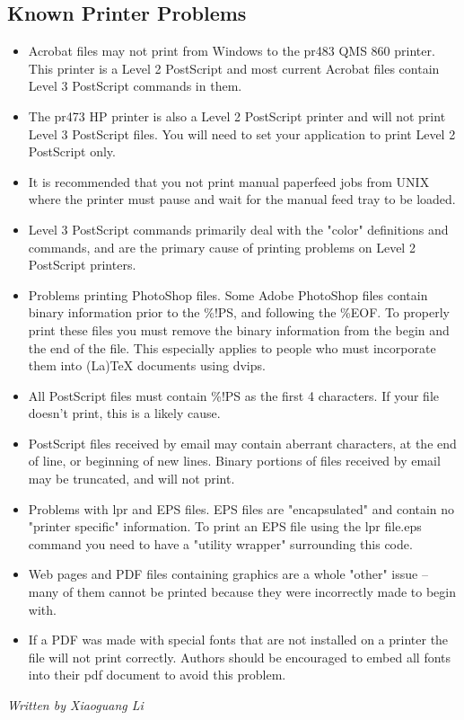 \documentclass[12pt,a4paper]{article}
\begin{document}
\subsection*{Known Printer Problems}
\begin{itemize}
    \item Acrobat files may not print from Windows to the pr483 QMS 860 printer. This printer is a Level 2 PostScript and most current Acrobat files contain Level 3 PostScript commands in them.
    \item The pr473 HP printer is also a Level 2 PostScript printer and will not print Level 3 PostScript files. You will need to set your application to print Level 2 PostScript only.
    \item It is recommended that you not print manual paperfeed jobs from UNIX where the printer must pause and wait for the manual feed tray to be loaded.
    \item Level 3 PostScript commands primarily deal with the "color" definitions and commands, and are the primary cause of printing problems on Level 2 PostScript printers.
    \item Problems printing PhotoShop files. Some Adobe PhotoShop files contain binary information prior to the \%!PS, and following the \%EOF. To properly print these files you must remove the binary information from the begin and the end of the file. This especially applies to people who must incorporate them into (La)TeX documents using dvips.
    \item All PostScript files must contain \%!PS as the first 4 characters. If your file doesn't print, this is a likely cause.
    \item PostScript files received by email may contain aberrant characters, at the end of line, or beginning of new lines. Binary portions of files received by email may be truncated, and will not print.
    \item Problems with lpr and EPS files. EPS files are "encapsulated" and contain no "printer specific" information. To print an EPS file using the lpr file.eps command you need to have a "utility wrapper" surrounding this code.
    \item Web pages and PDF files containing graphics are a whole "other" issue -- many of them cannot be printed because they were incorrectly made to begin with.
    \item If a PDF was made with special fonts that are not installed on a printer the file will not print correctly. Authors should be encouraged to embed all fonts into their pdf document to avoid this problem.
\end{itemize}
\hfill \textit{Written by Xiaoguang Li}
\end{document}
